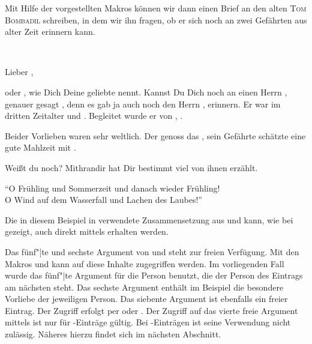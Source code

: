 \BeginIndexGroup
{}%
%
%
%
%
%
%
%
%
Mit Hilfe der vorgestellten Makros können wir dann einen Brief
an den alten \textsc{Tom Bombadil} schreiben, in dem wir ihn
fragen, ob er sich noch an zwei Gefährten aus alter Zeit
erinnern kann.
\begin{lstcode}
  \begin{letter}{\\}

    \opening{Lieber  ,}
     
    oder , wie Dich Deine geliebte 
    nennt. Kannst Du Dich noch an einen Herrn 
    , genauer gesagt , denn es gab
    ja auch noch den Herrn , erinnern. Er war 
     im dritten Zeitalter und .
    Begleitet wurde er von , .
      
    Beider Vorlieben waren sehr weltlich. Der 
     genoss das , sein Gefährte
    schätzte eine gute Mahlzeit mit .
      
    Weißt du noch? Mithrandir hat Dir bestimmt viel von ihnen 
    erzählt.

    \closing{"`O Frühling und Sommerzeit
                 und danach wieder Frühling!\\
               O Wind auf dem Wasserfall
                 und Lachen des Laubes!"'}
  \end{letter}
\end{lstcode}
Die in diesem Beispiel in  verwendete
Zusammensetzung aus  und
 kann, wie bei
 gezeigt, auch direkt mittels
 erhalten werden.

Das fünf"|te und sechste Argument von  und
 steht zur freien Verfügung.  Mit den Makros
 und  kann auf diese Inhalte zugegriffen werden. Im
vorliegenden Fall wurde das fünf"|te Argument für die Person benutzt, die der
Person des Eintrags am nächsten steht. Das sechste Argument enthält im
Beispiel die besondere Vorliebe der jeweiligen Person.  Das siebente Argument
ist ebenfalls ein freier Eintrag. Der Zugriff erfolgt per  oder
.  Der Zugriff auf das vierte freie Argument mittels
 ist nur für -Einträge gültig.
Bei -Einträgen ist seine Verwendung nicht
zulässig. Näheres hierzu findet sich im nächsten Abschnitt.
%
\EndIndexGroup
\EndIndexGroup

